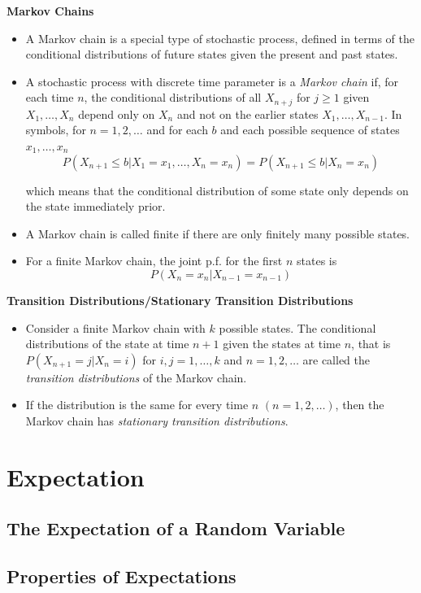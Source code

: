 \documentclass[11pt]{article}
\begin{document}
\textbf{Markov Chains}
\begin{itemize}
    \item A Markov chain is a special type of stochastic process, defined in terms of the 
    conditional distributions of future states given the present and past states. 
    \item A stochastic process with discrete time parameter is a \textit{Markov chain} if, for
    each time $n$, the conditional distributions of all $X_{n+j}$ for $j \ge 1$ given $X_1, 
    \ldots, X_n$ depend only on $X_n$ and not on the earlier states $X_1, \ldots, X_{n-1}$. In 
    symbols, for $n=1, 2, \ldots$ and for each $b$ and each possible sequence of states $x_1, 
    \ldots, x_n$ 
    \[ P(X_{n+1} \le b | X_1=x_1, \ldots, X_n=x_n) = P(X_{n+1} \le b | X_n = x_n)\]

    which means that the conditional distribution of some state only depends on the state 
    immediately prior. 
    \item A Markov chain is called finite if there are only finitely many possible states. 
    \item For a finite Markov chain, the joint p.f. for the first $n$ states is 
    \[ P(X_n=x_n | X_{n-1}= x_{n-1}) \]
\end{itemize}

\textbf{Transition Distributions/Stationary Transition Distributions}
\begin{itemize}
    \item Consider a finite Markov chain with $k$ possible states. The conditional 
    distributions of the state at time $n+1$ given the states at time $n$, that is $P(X_{n+1}
    = j | X_n = i)$ for $i,j = 1, \ldots, k$ and $n = 1, 2, \ldots$ are called the \textit{
    transition distributions} of the Markov chain. 
    \item If the distribution is the same for every time $n$ $(n=1, 2, \ldots)$, then the 
    Markov chain has \textit{stationary transition distributions}.
\end{itemize}

\section{Expectation}

\subsection{The Expectation of a Random Variable}
\subsection{Properties of Expectations}
\end{document}
